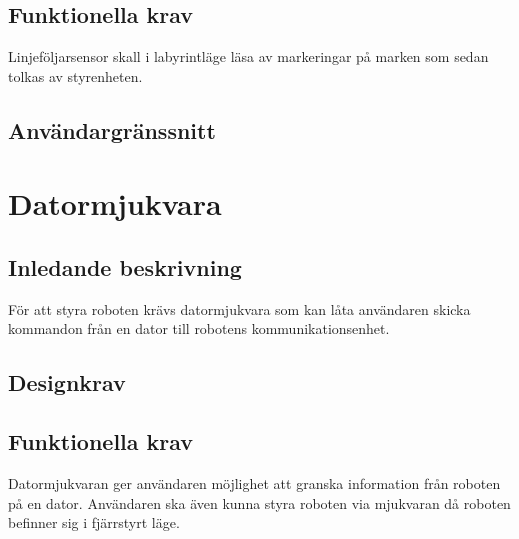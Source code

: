 \documentclass[a4paper,12pt]{article}
\begin{document}
\subsection{Funktionella krav}
Linjeföljarsensor skall i labyrintläge läsa av markeringar på marken som sedan tolkas av styrenheten.


\begin{LIPSkravlista}
\end{LIPSkravlista} 

\subsection{Användargränssnitt}
\begin{LIPSkravlista}
\end{LIPSkravlista}


\section{Datormjukvara}
\subsection{Inledande beskrivning}
För att styra roboten krävs datormjukvara som kan låta användaren skicka kommandon från en dator till robotens kommunikationsenhet. 


\begin{LIPSkravlista}
\end{LIPSkravlista}

\subsection{Designkrav}
\begin{LIPSkravlista}
\end{LIPSkravlista}

\subsection{Funktionella krav}
Datormjukvaran ger användaren möjlighet att granska information från roboten på en dator.
Användaren ska även kunna styra roboten via mjukvaran då roboten befinner sig i fjärrstyrt läge.
\end{document}
